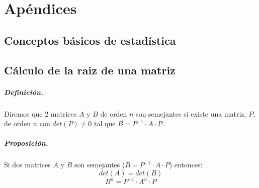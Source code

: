 
%
%
%
%
%
%
%
%

\chapter{Ap\'endices}
\label{sec:apendixes}


\section{Conceptos b\'asicos de estad\'istica}



\section{C\'alculo de la raiz de una matriz}

\paragraph{Definici\'on.}
Diremos que 2 matrices $A$ y $B$ de orden $n$ son semejantes si existe una 
matriz, $P$, de orden $n$ con $det(P) \neq 0$ tal que 
$B = P^{-1} \cdot A \cdot P$.


\paragraph{Proposici\'on.} Si dos matrices $A$ y $B$ son semejantes 
($B = P^{-1} \cdot A \cdot P$) entonces:
\begin{displaymath}
det(A) = det(B)
\end{displaymath}
\begin{displaymath}
B^n = P^{-1} \cdot A^{n} \cdot P
\end{displaymath}

